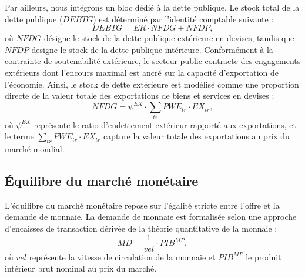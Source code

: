 \documentclass[11pt,a4paper]{article}
\newcommand{\vel}{\mathit{vel}}
\newcommand{\EX}{\mathit{EX}}
\newcommand{\PWE}{\mathit{PWE}}
\newcommand{\tr}{\mathit{tr}}
\newcommand{\PIB}{\mathit{PIB}}
\newcommand{\NFDG}{\mathit{NFDG}}
\newcommand{\NFDP}{\mathit{NFDP}}
\newcommand{\MD}{\mathit{MD}}
\newcommand{\ER}{\mathit{ER}}
\newcommand{\DEBTG}{\mathit{DEBTG}}
\begin{document}
Par ailleurs, nous intégrons un bloc dédié à la dette publique. Le stock total de la dette publique ($\DEBTG$) est déterminé par l'identité comptable suivante :
\begin{equation}
	\DEBTG = \ER \cdot \NFDG + \NFDP,
\end{equation} 
où $\NFDG$ désigne le stock de la dette publique extérieure en devises, tandis que $\NFDP$ designe le stock de la dette publique intérieure. Conformément à la contrainte de soutenabilité extérieure, le secteur public contracte des engagements extérieurs dont l'encours maximal est ancré sur la capacité d'exportation de l'économie. Ainsi, le stock de dette extérieure est modélisé comme une proportion directe de la valeur totale des exportations de biens et services en devises :
\begin{equation*}
	\NFDG = \psi^{\EX} \cdot \sum_{\tr} \PWE_{\tr} \cdot \EX_{\tr},
\end{equation*} 
où $\psi^{\EX}$ représente le ratio d'endettement extérieur rapporté aux exportations, et le terme $\sum_{\tr} \PWE_{\tr} \cdot \EX_{\tr}$ capture la valeur totale des exportations au prix du marché mondial.


 
	
	\subsection{Équilibre du marché monétaire}
	L'équilibre du marché monétaire repose sur l'égalité stricte entre l'offre et la demande de monnaie. La demande de monnaie est formalisée selon une approche d'encaisses de transaction dérivée de la théorie quantitative de la monnaie :
	\begin{equation*}
		\MD = \frac{1}{\vel} \cdot \PIB^{\mathit{MP}},
	\end{equation*}
	où $\vel$ représente la vitesse de circulation de la monnaie et $\PIB^{\mathit{MP}}$ le produit intérieur brut nominal au prix du marché.
	
\end{document}
